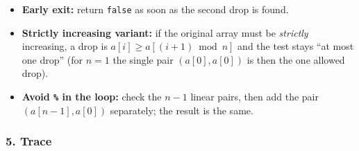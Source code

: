 \begin{tricksbox}
\begin{itemize}[leftmargin=*]
    \item \textbf{Early exit:} return \texttt{false} as soon as the second drop is found.
    \item \textbf{Strictly increasing variant:} if the original array must be \emph{strictly} increasing, a drop is $a[i] \ge a[(i+1) \bmod n]$ and the test stays ``at most one drop'' (for $n = 1$ the single pair $(a[0], a[0])$ is then the one allowed drop).
    \item \textbf{Avoid \texttt{\%} in the loop:} check the $n-1$ linear pairs, then add the pair $(a[n-1], a[0])$ separately; the result is the same.
\end{itemize}
\end{tricksbox}

\subsubsection*{5. Trace}

